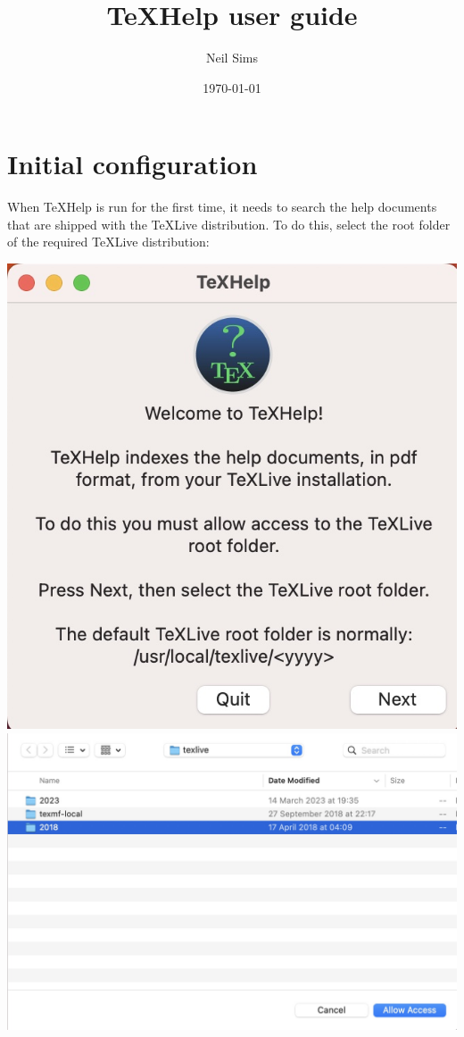 \documentclass[11pt,a4paper]{article}
\title{\TeX Help user guide}
\author{Neil Sims}
\date{\today}                                           %
\begin{document}
\maketitle
\section{Initial configuration}
When \TeX Help is run for the first time, it needs to search the help documents that are shipped with the \TeX Live distribution. To do this, select the root folder of the required \TeX Live distribution:

\includegraphics[scale=0.25]{WelcomePage.jpg} \includegraphics[scale=0.2]{RootFolder.jpg}
\end{document}
